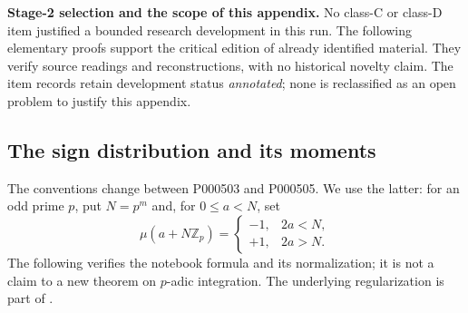 \noindent\textbf{Stage-2 selection and the scope of this appendix.}
No class-C or class-D item justified a bounded research development in this run.
The following elementary proofs support the critical edition of already identified
material. They verify source readings and reconstructions, with no historical
novelty claim. The item records retain development status \textit{annotated};
none is reclassified as an open problem to justify this appendix.


\subsection{The sign distribution and its moments}
The conventions change between P000503 and P000505. We use the latter: for an odd
prime \(p\), put \(N=p^m\) and, for \(0\le a<N\), set
\[
 \mu(a+N\mathbb Z_p)=\begin{cases}-1,&2a<N,\\+1,&2a>N.\end{cases}
\]
The following verifies the notebook formula and its normalization; it is not a
claim to a new theorem on \(p\)-adic integration. The underlying regularization is
part of \citet[\S8.4]{manin1973periods}.

